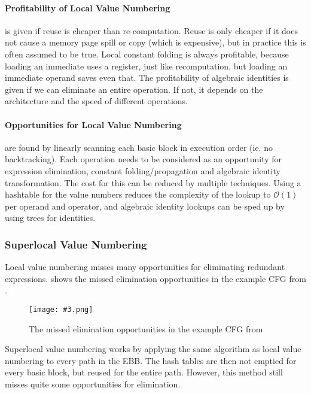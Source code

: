 \documentclass{article}
\newcommand{\fig}[4]{
	\begin{figure}[#1]
		\center
		\texttt{[image: \#3.png]}
		\caption{#4}
		\label{fig:#3}
	\end{figure}
	}
\begin{document}
\paragraph{Profitability of Local Value Numbering} is given if reuse is cheaper than re-computation.
Reuse is only cheaper if it does not cause a memory page spill or copy (which is expensive), but in practice this is often assumed to be true.
Local constant folding is always profitable, because loading an immediate uses a register, just like recomputation, but loading an immediate operand saves even that.
The profitability of algebraic identities is given if we can eliminate an entire operation.
If not, it depends on the architecture and the speed of different operations.

\paragraph{Opportunities for Local Value Numbering} are found by linearly scanning each basic block in execution order (ie. no backtracking).
Each operation needs to be considered as an opportunity for expression elimination, constant folding/propagation and algebraic identity transformation.
The cost for this can be reduced by multiple techniques.
Using a hashtable for the value numbers reduces the complexity of the lookup to $\mathcal{O}(1)$ per operand and operator, and algebraic identity lookups can be sped up by using trees for identities.

\subsubsection{Superlocal Value Numbering}
Local value numbering misses many opportunities for eliminating redundant expressions.
 shows the missed elimination opportunities in the example CFG from .

\fig{h}{0.7}{missedops}{The missed elimination opportunities in the example CFG from \Cref{cfg}}

Superlocal value numbering works by applying the same algorithm as local value numbering to every path in the EBB.
The hash tables are then not emptied for every basic block, but reused for the entire path.
However, this method still misses quite some opportunities for elimination.
\end{document}
